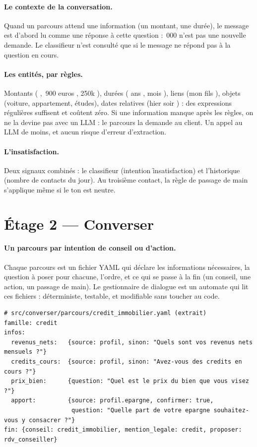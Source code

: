 \paragraph{Le contexte de la conversation.} Quand un parcours attend une information (un montant,
une durée), le message est d'abord lu comme une réponse à cette question : \,000 \fg{} n'est
pas une nouvelle demande. Le classifieur n'est consulté que si le message ne répond pas à la
question en cours.

\paragraph{Les entités, par règles.} Montants (\eur{} \fg, \,900 euros \fg, \og 250k
\fg), durées ( ans \fg,  mois \fg), liens (\og mon fils \fg), objets (voiture,
appartement, études), dates relatives (\og hier soir \fg) : des expressions régulières suffisent et
coûtent zéro. Si une information manque après les règles, on ne la devine pas avec un LLM : le
parcours la demande au client. Un appel au LLM de moins, et aucun risque d'erreur d'extraction.

\paragraph{L'insatisfaction.} Deux signaux combinés : le classifieur (intention
\f{insatisfaction}) et l'historique (nombre de contacts du jour). Au troisième contact, la règle de
passage de main s'applique même si le ton est neutre.

\section{Étage 2 --- Converser}

\paragraph{Un parcours par intention de conseil ou d'action.} Chaque parcours est un fichier YAML
qui déclare les informations nécessaires, la question à poser pour chacune, l'ordre, et ce qui
se passe à la fin (un conseil, une action, un passage de main). Le gestionnaire de dialogue est un
automate qui lit ces fichiers : déterministe, testable, et modifiable sans toucher au code.

\begin{code}
\footnotesize
\begin{verbatim}
# src/converser/parcours/credit_immobilier.yaml (extrait)
famille: credit
infos:
  revenus_nets:   {source: profil, sinon: "Quels sont vos revenus nets mensuels ?"}
  credits_cours:  {source: profil, sinon: "Avez-vous des credits en cours ?"}
  prix_bien:      {question: "Quel est le prix du bien que vous visez ?"}
  apport:         {source: profil.epargne, confirmer: true,
                   question: "Quelle part de votre epargne souhaitez-vous y consacrer ?"}
fin: {conseil: credit_immobilier, mention_legale: credit, proposer: rdv_conseiller}
\end{verbatim}
\end{code}


